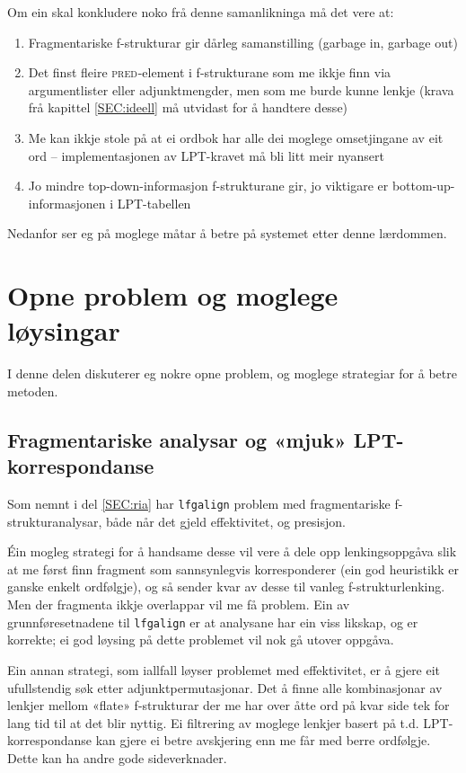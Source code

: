 \documentclass[12pt,a4paper,oneside,draft]{report}
\newcommand{\F}[2]{\textsc{#1}\ensuremath{_{#2}}}
\newcommand{\PRED}{\F{pred}{}}
\begin{document}
Om ein skal konkludere noko frå denne samanlikninga må det vere at:
\begin{enumerate}
\item Fragmentariske f\hyp{}strukturar gir dårleg samanstilling (garbage in,
   garbage out)
\item Det finst fleire \PRED{}-element i f\hyp{}strukturane som me ikkje finn
   via argumentlister eller adjunktmengder, men som me burde kunne
   lenkje (krava frå kapittel \ref{SEC:ideell} må utvidast for å
   handtere desse)
\item Me kan ikkje stole på at ei ordbok har alle dei moglege
   omsetjingane av eit ord -- implementasjonen av LPT-kravet må
   bli litt meir nyansert
\item Jo mindre top-down-informasjon f\hyp{}strukturane gir, jo viktigare er
   bottom-up-informasjonen i LPT-tabellen
\end{enumerate}
Nedanfor ser eg på moglege måtar å betre på systemet etter denne
lærdommen.

\section{Opne problem og moglege løysingar}
\label{sec-5.4}

   \label{SEC:opneproblem}

I denne delen diskuterer eg nokre opne problem, og moglege strategiar
for å betre metoden.

\subsection{Fragmentariske analysar og «mjuk» LPT\hyp{}korrespondanse}
\label{sec-5.4.1}

Som nemnt i del \ref{SEC:ria} har \texttt{lfgalign} problem med
 fragmentariske f\hyp{}strukturanalysar, både når det gjeld effektivitet,
 og presisjon.

Éin mogleg strategi for å handsame desse vil vere å dele opp
 lenkingsoppgåva slik at me først finn fragment som sannsynlegvis
 korresponderer (ein god heuristikk er ganske enkelt ordfølgje), og så
 sender kvar av desse til vanleg f\hyp{}strukturlenking. Men der fragmenta
 ikkje overlappar vil me få problem. Ein av grunnføresetnadene til
 \texttt{lfgalign} er at analysane har ein viss likskap, og er korrekte; ei
 god løysing på dette problemet vil nok gå utover oppgåva.

Ein annan strategi, som iallfall løyser problemet med effektivitet, er
 å gjere eit ufullstendig søk etter adjunktpermutasjonar. Det å finne
 alle kombinasjonar av lenkjer mellom «flate» f\hyp{}strukturar der me har
 over åtte ord på kvar side tek for lang tid til at det blir
 nyttig. Ei filtrering av moglege lenkjer basert på
 t.d. LPT\hyp{}korrespondanse kan gjere ei betre avskjering enn me får med
 berre ordfølgje. Dette kan ha andre gode sideverknader.
\end{document}

